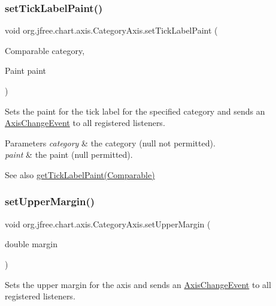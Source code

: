\subsubsection{\texorpdfstring{set\+Tick\+Label\+Paint()}{setTickLabelPaint()}}
{\footnotesize\ttfamily void org.\+jfree.\+chart.\+axis.\+Category\+Axis.\+set\+Tick\+Label\+Paint (\begin{DoxyParamCaption}\item[{Comparable}]{category,  }\item[{Paint}]{paint }\end{DoxyParamCaption})}

Sets the paint for the tick label for the specified category and sends an \mbox{\hyperlink{}{Axis\+Change\+Event}} to all registered listeners.


\begin{DoxyParams}{Parameters}
{\em category} & the category ({\ttfamily null} not permitted). \\
\hline
{\em paint} & the paint ({\ttfamily null} permitted).\\
\hline
\end{DoxyParams}
\begin{DoxySeeAlso}{See also}
\mbox{\hyperlink{classorg_1_1jfree_1_1chart_1_1axis_1_1_category_axis_a3cda1e89a63b0151e4e61ff531f0018f}{get\+Tick\+Label\+Paint(\+Comparable)}} 
\end{DoxySeeAlso}
\mbox{\label{classorg_1_1jfree_1_1chart_1_1axis_1_1_category_axis_ac33882eb8c882b5d1750d349870fce65}} 
\subsubsection{\texorpdfstring{set\+Upper\+Margin()}{setUpperMargin()}}
{\footnotesize\ttfamily void org.\+jfree.\+chart.\+axis.\+Category\+Axis.\+set\+Upper\+Margin (\begin{DoxyParamCaption}\item[{double}]{margin }\end{DoxyParamCaption})}

Sets the upper margin for the axis and sends an \mbox{\hyperlink{}{Axis\+Change\+Event}} to all registered listeners.


